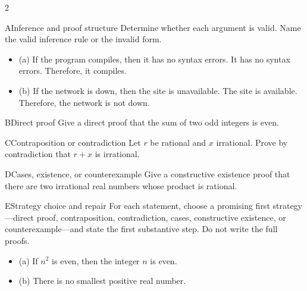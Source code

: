 \documentclass[9pt]{extarticle}
\begin{document}
\begin{multicols}{2}
\begin{CoreProblem}{A}{Inference and proof structure}
Determine whether each argument is valid. Name the valid inference rule or the invalid form.
\begin{itemize}
  \item (a) If the program compiles, then it has no syntax errors. It has no syntax errors. Therefore, it compiles.
  \item (b) If the network is down, then the site is unavailable. The site is
        available. Therefore, the network is not down.
\end{itemize}
\end{CoreProblem}
\begin{CoreProblem}{B}{Direct proof}
Give a direct proof that the sum of two odd integers is even.
\end{CoreProblem}
\begin{CoreProblem}{C}{Contraposition or contradiction}
Let $r$ be rational and $x$ irrational. Prove by contradiction that $r+x$ is irrational.
\end{CoreProblem}
\columnbreak
\begin{CoreProblem}{D}{Cases, existence, or counterexample}
Give a constructive existence proof that there are two irrational real numbers
whose product is rational.
\end{CoreProblem}
\begin{CoreProblem}{E}{Strategy choice and repair}
For each statement, choose a promising first strategy---direct proof,
contraposition, contradiction, cases, constructive existence, or
counterexample---and state the first substantive step. Do not write the full
proofs.
\begin{itemize}
  \item (a) If $n^2$ is even, then the integer $n$ is even.
  \item (b) There is no smallest positive real number.
\end{itemize}
\end{CoreProblem}
\end{multicols}
\CoreWorkArea
\FormBreak
{}
\end{document}
